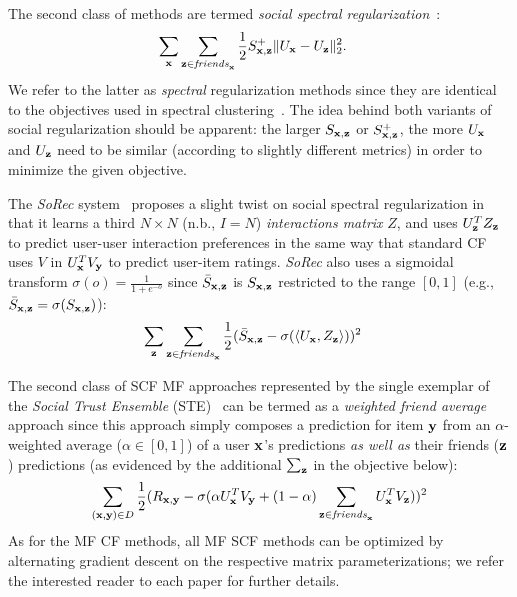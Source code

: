 The second class of methods are termed 
\emph{social spectral regularization}~\cite{sr,rrmf}:
\begin{align}
\sum_{\mathbf{x}} & \sum_{\mathbf{z} \in \mathit{friends}_{\mathbf{x}}} \frac{1}{2} S^+_{\mathbf{x},\mathbf{z}} \| U_{\mathbf{x}} - U_{\mathbf{z}} \|_2^2 \label{eq:simple_spectral_sr}
\text{.}
\end{align}
We refer to the latter as \emph{spectral} regularization methods since they are
identical to the objectives used in spectral clustering~\cite{spectral}.
The idea behind both variants of social regularization should be apparent:
the larger $S_{\mathbf{x},\mathbf{z}}$ or $S^+_{\mathbf{x},\mathbf{z}}$, the more $U_{\mathbf{x}}$ and $U_{\mathbf{z}}$ need to
be similar (according to slightly different metrics) 
in order to minimize the given objective.

The {\it SoRec} system~\cite{sorec} proposes a slight twist on social
spectral regularization in that it learns a third $N \times N$ (n.b., $I = N$)
\emph{interactions matrix} $Z$, and uses $U_{\mathbf{z}}^T Z_{\mathbf{z}}$ to predict user-user
interaction preferences in the same way that standard CF uses $V$ in
$U_{\mathbf{x}}^T V_{\mathbf{y}}$ to predict user-item ratings.  {\it SoRec} also uses a
sigmoidal transform $\sigma(o) = \frac{1}{1 + e^{-o}}$ since $\bar{S}_{\mathbf{x},\mathbf{z}}$
is $S_{\mathbf{x},\mathbf{z}}$ restricted to the range $[0,1]$ 
(e.g., $\bar{S}_{\mathbf{x},\mathbf{z}} = \sigma(S_{\mathbf{x},\mathbf{z}})$):
%
%
\begin{align}
\sum_{\mathbf{z}} & \sum_{\mathbf{z} \in \mathit{friends}_{\mathbf{x}}} \frac{1}{2} (\bar{S}_{\mathbf{x},\mathbf{z}} - \sigma(\langle U_{\mathbf{x}}, Z_{\mathbf{z}} \rangle))^2 
\end{align}

The second class of SCF MF approaches represented by the single
exemplar of the {\it Social Trust Ensemble} (STE)~\cite{ste} can be termed as a
\emph{weighted friend average} approach since this approach simply composes a
prediction for item $\mathbf{y}$ from an $\alpha$-weighted average ($\alpha
\in [0,1]$) of a user $\mathbf{x}$'s predictions \emph{as well as} their friends
($\mathbf{z}$) predictions (as evidenced by the additional $\sum_{\mathbf{z}}$ in the
objective below):
\begin{align}
\sum_{(\mathbf{x},\mathbf{y}) \in D} \frac{1}{2} (R_{\mathbf{x},\mathbf{y}} - \sigma (\alpha U_{\mathbf{x}}^T V_{\mathbf{y}} + (1 - \alpha) \sum_{\mathbf{z} \in \mathit{friends}_{\mathbf{x}}} U_{\mathbf{x}}^T V_{\mathbf{z}}))^2 
\end{align}
As for the MF CF methods, all MF SCF methods can be optimized by alternating
gradient descent on the respective matrix parameterizations; we refer
the interested reader to each paper for further details.

